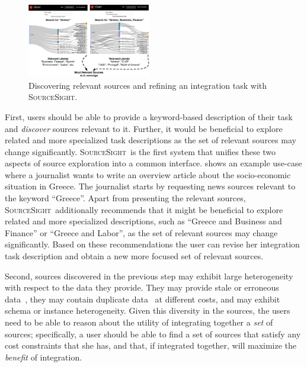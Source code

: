 \documentclass{vldb}
\newcommand\system{\textsc{SourceSight}}
\begin{document}
\begin{figure}
	\begin{center}
	\includegraphics[trim=0 0 0 60, clip,width=0.48\textwidth]{fig/exploreCor}
	\vspace{-20pt}
	\caption{Discovering relevant sources and refining an integration task with \system.}
	\label{fig:exploration}
	\end{center}
	\vspace{-25pt}
\end{figure}


First, users should be able to provide a keyword-based description of their task and {\em discover} sources relevant to it. Further, it would be beneficial to explore related and more specialized task descriptions as the set of relevant sources may change significantly. \system~is the first system that unifies these two aspects of source exploration into  a common interface.  shows an example use-case where a journalist wants to write an overview article about the socio-economic situation in Greece. The journalist starts by requesting news sources relevant to the keyword ``Greece''. Apart from presenting the relevant sources, \system~additionally recommends that it might be beneficial to explore related and more specialized descriptions, such as ``Greece and Business and Finance'' or ``Greece and Labor'', as the set of relevant sources may change significantly. Based on these recommendations the user can revise her integration task description and obtain a new more focused set of relevant sources.

Second, sources discovered in the previous step may exhibit large heterogeneity with respect to the data they provide. They may provide stale or erroneous data~\cite{Dong_vldb:2009, li:2012}, they may contain duplicate data~\cite{bronzi:2013, li:2012} at different costs, and may exhibit schema or instance heterogeneity. Given this diversity in the sources, the users need to be able to reason about the utility of integrating together a {\em set} of sources; specifically, a user should be able to find a set of sources that satisfy any cost constraints that she has, and that, if integrated together, will maximize the {\em benefit} of integration. %
\end{document}
